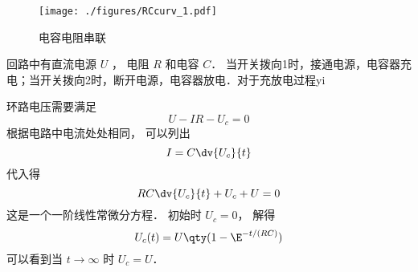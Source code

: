
\begin{issues}
\issueDraft
\end{issues}

\begin{figure}[ht]
\centering
\texttt{[image: ./figures/RCcurv\_1.pdf]}
\caption{电容电阻串联} \label{RCcurv_fig1}
\end{figure}
回路中有直流电源 $U$ ， 电阻 $R$ 和电容 $C$． 当开关拨向1时，接通电源，电容器充电；当开关拨向2时，断开电源，电容器放电．对于充放电过程yi


环路电压需要满足
\begin{equation}
U - IR - U_c = 0
\end{equation}
根据电路中电流处处相同， 可以列出
\begin{equation}
I = C\dv{U_c}{t}
\end{equation}
代入得
\begin{equation}
RC\dv{U_c}{t} + U_c + U = 0
\end{equation}
这是一个一阶线性常微分方程． 初始时 $U_c = 0$， 解得
\begin{equation}
U_c(t) = U\qty(1 - \E^{-t/(RC)})
\end{equation}
可以看到当 $t \to \infty$ 时 $U_c = U$．


